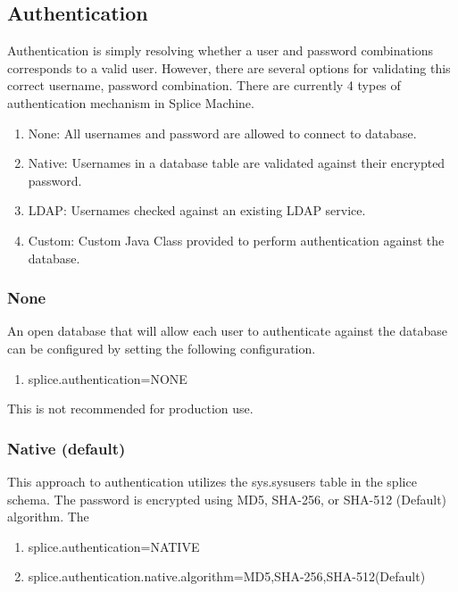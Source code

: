\documentclass{article}
\begin{document}
\subsection{Authentication}

Authentication is simply resolving whether a user and password combinations
corresponds to a valid user.  However, there are several options for validating
this correct username, password combination.  There are currently 4 types of
authentication mechanism in Splice Machine.

\begin{enumerate}
	\item None: All usernames and password are allowed to connect to database.
	\item Native: Usernames in a database table are validated against their
	encrypted password.
	\item LDAP: Usernames checked against an existing LDAP service.
	\item Custom: Custom Java Class provided to perform authentication against the
	database.
\end{enumerate}

\subsubsection{None}
An open database that will allow each user to authenticate against the database
can be configured by setting the following configuration.

\begin{enumerate}
	\item splice.authentication=NONE
\end{enumerate}

This is not recommended for production use.


\subsubsection{Native (default)}
This approach to authentication utilizes the sys.sysusers table in the splice
schema.  The password is encrypted using MD5, SHA-256, or
SHA-512 (Default) algorithm.  The 

\begin{enumerate}
	\item splice.authentication=NATIVE
      \item splice.authentication.native.algorithm=MD5,SHA-256,SHA-512(Default)
\end{enumerate}
\end{document}
